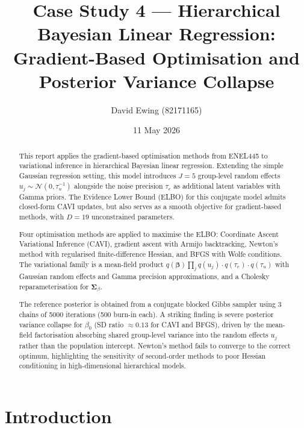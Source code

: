 \documentclass[11pt,a4paper]{article}
\title{
Case Study 4 --- Hierarchical Bayesian Linear Regression:\\[0.4em]
Gradient-Based Optimisation and Posterior Variance Collapse
}
\author{
  David Ewing (82171165)
}
\date{11 May 2026}
\begin{document}
\maketitle

\begin{abstract}
\setlength{\parindent}{0pt}
\setlength{\parskip}{0.7em}

This report applies the gradient-based optimisation methods from ENEL445 to variational
inference in hierarchical Bayesian linear regression.
Extending the simple Gaussian regression setting, this model introduces $J=5$ group-level
random effects $u_j \sim \mathcal{N}(0,\tau_u^{-1})$ alongside the noise precision
$\tau_e$ as additional latent variables with Gamma priors.
The Evidence Lower Bound (ELBO) for this conjugate model admits closed-form CAVI updates,
but also serves as a smooth objective for gradient-based methods, with $D=19$ unconstrained
parameters.

Four optimisation methods are applied to maximise the ELBO:
Coordinate Ascent Variational Inference (CAVI), gradient ascent with Armijo backtracking,
Newton's method with regularised finite-difference Hessian, and BFGS with Wolfe conditions.
The variational family is a mean-field product
$q(\bm{\beta})\prod_j q(u_j) \cdot q(\tau_e)\cdot q(\tau_u)$
with Gaussian random effects and Gamma precision approximations, and a
Cholesky reparameterisation for $\bm{\Sigma}_\beta$.

The reference posterior is obtained from a conjugate blocked Gibbs sampler
using 3 chains of 5000 iterations (500 burn-in each).
A striking finding is severe posterior variance collapse for $\beta_0$
(SD ratio $\approx 0.13$ for CAVI and BFGS), driven by the mean-field factorisation
absorbing shared group-level variance into the random effects $u_j$ rather than
the population intercept.
Newton's method fails to converge to the correct optimum, highlighting the
sensitivity of second-order methods to poor Hessian conditioning in high-dimensional
hierarchical models.

\end{abstract}

\newpage

\section{Introduction}
\end{document}
